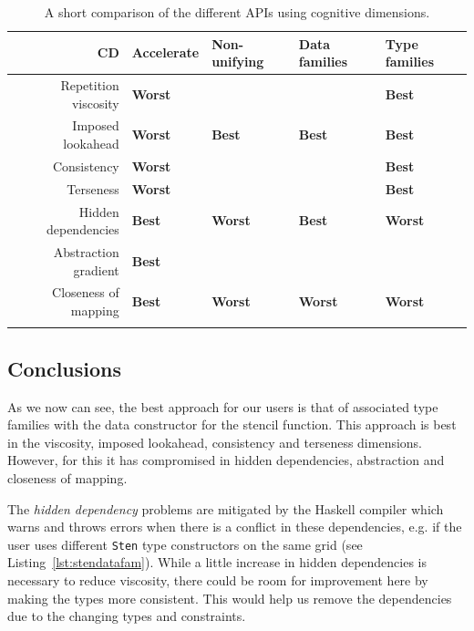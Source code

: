 \documentclass[
    12pt,
    a4paper,
    twoside,
    openright,
    ]{scrbook}
\begin{document}
\begin{longtable}{r | l l l l}
\hline

CD & Accelerate & Non-unifying & Data families & Type families

\\ \hline

Repetition viscosity & \textbf{Worst} & & & \textbf{Best}
\\

Imposed lookahead & \textbf{Worst} & \textbf{Best} & \textbf{Best} &
\textbf{Best}
\\

Consistency & \textbf{Worst} & & & \textbf{Best}
\\

Terseness & \textbf{Worst} & & & \textbf{Best}
\\

Hidden dependencies & \textbf{Best} & \textbf{Worst} & \textbf{Best} &
\textbf{Worst}
\\

Abstraction gradient & \textbf{Best} & & &
\\

Closeness of mapping & \textbf{Best} & \textbf{Worst} & \textbf{Worst} &
\textbf{Worst}
\\
\hline

\caption{A short comparison of the different APIs using cognitive
  dimensions. \label{tbl:cogcompbrief}}
\end{longtable}

\subsection{Conclusions}

As we now can see, the best approach for our users is that of associated type
families with the data constructor for the stencil function. This approach is
best in the viscosity, imposed lookahead, consistency and terseness
dimensions. However, for this it has compromised in hidden dependencies,
abstraction and closeness of mapping.

The \emph{hidden dependency} problems are mitigated by the Haskell compiler
which warns and throws errors when there is a conflict in these dependencies,
e.g. if the user uses different \texttt{Sten} type constructors on the same grid
(see Listing~\ref{lst:stendatafam}). While a little increase in hidden
dependencies is necessary to reduce viscosity, there could be room for
improvement here by making the types more consistent. This would help us remove
the dependencies due to the changing types and constraints.
\end{document}
